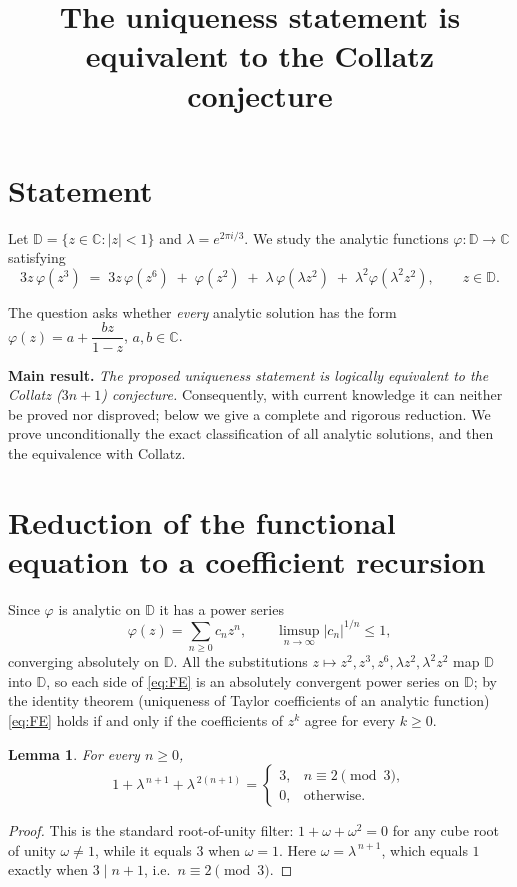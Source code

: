 \documentclass{amsart}
\newtheorem{lemma}{Lemma}
\theoremstyle{remark}
\begin{document}
\title{The uniqueness statement is equivalent to the Collatz conjecture}
\maketitle

\section*{Statement}
Let $\mathbb{D} = \{z \in \mathbb{C} : |z| < 1\}$ and $\lambda = e^{2\pi i/3}$.
We study the analytic functions $\varphi:\mathbb{D}\to\mathbb{C}$ satisfying
\begin{equation}\label{eq:FE}
3z\,\varphi(z^3) \;=\; 3z\,\varphi(z^6) \;+\; \varphi(z^2) \;+\; \lambda\,\varphi(\lambda z^2) \;+\; \lambda^2 \varphi(\lambda^2 z^2),
\qquad z\in\mathbb{D}.
\end{equation}

The question asks whether \emph{every} analytic solution has the form
$\varphi(z)=a+\dfrac{bz}{1-z}$, $a,b\in\mathbb{C}$.

\medskip
\noindent\textbf{Main result.} \emph{The proposed uniqueness statement is logically equivalent to the
Collatz ($3n+1$) conjecture.} Consequently, with current knowledge it can neither be proved nor
disproved; below we give a complete and rigorous reduction. We prove unconditionally the exact
classification of all analytic solutions, and then the equivalence with Collatz.

\section{Reduction of the functional equation to a coefficient recursion}

Since $\varphi$ is analytic on $\mathbb{D}$ it has a power series
\begin{equation}\label{eq:series}
\varphi(z)=\sum_{n\ge 0}c_n z^n,\qquad \limsup_{n\to\infty}|c_n|^{1/n}\le 1,
\end{equation}
converging absolutely on $\mathbb{D}$. All the substitutions $z\mapsto z^2,z^3,z^6,\lambda z^2,\lambda^2 z^2$
map $\mathbb{D}$ into $\mathbb{D}$, so each side of \eqref{eq:FE} is an absolutely convergent power
series on $\mathbb{D}$; by the identity theorem (uniqueness of Taylor coefficients of an analytic
function) \eqref{eq:FE} holds if and only if the coefficients of $z^k$ agree for every $k\ge 0$.

\begin{lemma}\label{lem:sym}
For every $n\ge 0$,
\[
1+\lambda^{\,n+1}+\lambda^{\,2(n+1)}=
\begin{cases}
3,& n\equiv 2 \pmod 3,\\[2pt]
0,& \text{otherwise.}
\end{cases}
\]
\end{lemma}
\begin{proof}
This is the standard root-of-unity filter: $1+\omega+\omega^2=0$ for any cube root of unity
$\omega\ne 1$, while it equals $3$ when $\omega=1$. Here $\omega=\lambda^{\,n+1}$, which equals
$1$ exactly when $3\mid n+1$, i.e.\ $n\equiv 2\pmod 3$.
\end{proof}
\end{document}
